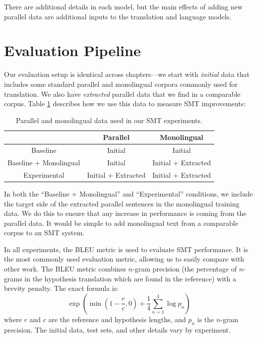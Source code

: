 There are additional details in each model, but the main effects of adding new
parallel data are additional inputs to the translation and language models.

\section{Evaluation Pipeline}
Our evaluation setup is identical across chapters---we start with {\em initial}
data that includes some standard parallel and monolingual corpora commonly used for 
translation. We also have {\em extracted} parallel data that we find in a comparable
corpus. Table \ref{tab:exp_setup} describes how we use this data to measure SMT
improvements:

\begin{table}
\begin{center}
\begin{tabular}{|c||c|c|}
\hline
& Parallel & Monolingual \\
\hline
Baseline & Initial & Initial \\
\hline
Baseline + Monolingual & Initial & Initial + Extracted \\
\hline
Experimental & Initial + Extracted & Initial + Extracted \\
\hline
\end{tabular}
\end{center}
\label{tab:exp_setup}
\caption{Parallel and monolingual data used in our SMT experiments.}
\end{table}

In both the ``Baseline + Monolingual'' and ``Experimental'' conditions, we include the target side of
the extracted parallel sentences in the monolingual training data. We do this to
ensure that any increase in performance is coming from the parallel data. It
would be simple to add monolingual text from a comparable corpus to an SMT
system.

In all experiments, the BLEU metric \citep{Papineni02} is used to evaluate SMT
performance. It is the most commonly used evaluation metric, allowing us to
easily compare with other work.
The BLEU metric combines $n$-gram precision (the percentage of
$n$-grams in the hypothesis translation which are found in the reference) with a
brevity penalty. The exact formula is:
\begin{equation}
\exp(\min(1-\frac{r}{c},0) + \frac{1}{4}\sum^4_{n=1}\log p_n)
\end{equation}
where $r$ and $c$ are the reference and hypothesis lengths, and $p_n$ is the
$n$-gram precision.
The initial data, test sets, and other details vary by experiment.

